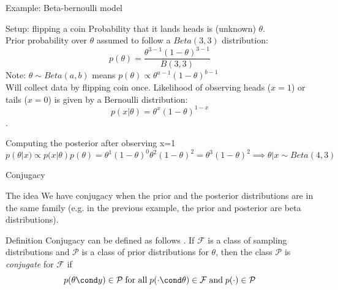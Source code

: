 \documentclass[10pt]{beamer}
\begin{document}
\begin{frame}{Example: Beta-bernoulli model}

\begin{sblock}{Setup: flipping a coin}
Probability that it lands heads is (unknown) $\theta$. \\
Prior probability over $\theta$ assumed to follow a $Beta(3,3)$ distribution:
$$ p(\theta) = \frac{\theta^{3-1}(1-\theta)^{3-1}}{B(3,3)}$$
Note: $\theta \sim Beta(a, b)$ means $p(\theta) \propto \theta^{a-1}(1-\theta)^{b-1}$\\
Will collect data by flipping coin once. Likelihood of observing heads ($x=1$) or tails ($x=0$) is given by a Bernoulli distribution:
$$p(x | \theta) = \theta^x(1-\theta)^{1-x} $$.
\end{sblock}
\begin{sblock}{Computing the posterior after observing x=1}
$$p(\theta| x) \propto p(x | \theta) p(\theta) = \theta^1(1-\theta)^{0}  \theta^{2}(1-\theta)^{2}  = \theta^3 (1-\theta)^2 \implies \theta | x \sim Beta(4,3)$$
\end{sblock}

\end{frame}


\begin{frame}{Conjugacy}

\begin{sblock}{The idea}
We have conjugacy when the prior and the posterior distributions are in the same family (e.g. in the previous example, the prior and posterior are beta distributions).
\end{sblock}

\begin{sblock}{Definition}
Conjugacy can be defined as follows \cite{gelman2013bayesian}. If $\mathcal{F}$ is a class of sampling distributions and $\mathcal{P}$ is a class of prior distributions for $\theta$, then the class $\mathcal{P}$ is \textit{conjugate} for $\mathcal{F}$ if
\[  p(\theta \cond y ) \in \mathcal{P} \; \text{for all} \; p(\cdot \cond \theta) \in \mathcal{F} \; \text{and} \; p(\cdot) \in \mathcal{P} \]
\end{sblock}

\end{frame}


\end{document}
